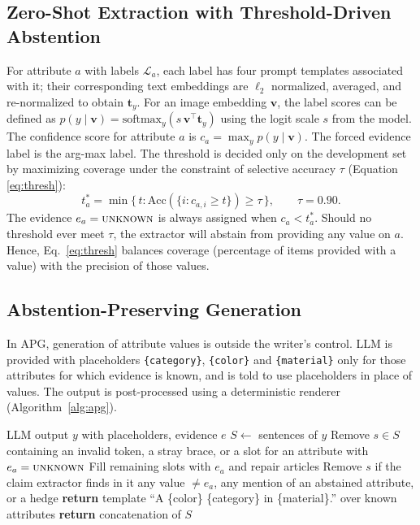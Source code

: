 \documentclass[runningheads]{llncs}
\newcommand{\unk}{\textsc{unknown}}
\begin{document}
\subsection{Zero-Shot Extraction with Threshold-Driven Abstention}
For attribute $a$ with labels $\mathcal{L}_a$, each label has four prompt templates associated with it; their corresponding text embeddings are $\ell_2$ normalized, averaged, and re-normalized to obtain $\mathbf{t}_y$. For an image embedding $\mathbf{v}$, the label scores can be defined as $p(y\mid\mathbf{v})=\mathrm{softmax}_y(s\,\mathbf{v}^\top\mathbf{t}_y)$ using the logit scale $s$ from the model. The confidence score for attribute $a$ is $c_a=\max_y p(y\mid\mathbf{v})$. The forced evidence label is the arg-max label. The threshold is decided only on the development set by maximizing coverage under the constraint of selective accuracy $\tau$ (Equation \ref{eq:thresh}):
\begin{equation}
t_a^{*}=\min\{\,t : \mathrm{Acc}(\{i : c_{a,i}\geq t\})\geq\tau\,\},\qquad \tau=0.90.
\label{eq:thresh}
\end{equation}
The evidence $e_a=\unk$ is always assigned when $c_a < t_a^*$. Should no threshold ever meet $\tau$, the extractor will abstain from providing any value on $a$. Hence, Eq.~\ref{eq:thresh} balances coverage (percentage of items provided with a value) with the precision of those values.

\subsection{Abstention-Preserving Generation}
In APG, generation of attribute values is outside the writer's control. LLM is provided with placeholders \texttt{\{category\}}, \texttt{\{color\}} and \texttt{\{material\}} only for those attributes for which evidence is known, and is told to use placeholders in place of values. The output is post-processed using a deterministic renderer (Algorithm~\ref{alg:apg}).

\begin{algorithm}[!htb]
\footnotesize
\caption{APG renderer}
\label{alg:apg}
\begin{algorithmic}[1]
\REQUIRE LLM output $y$ with placeholders, evidence $e$
\STATE $S \leftarrow$ sentences of $y$
\STATE Remove $s\in S$ containing an invalid token, a stray brace, or a slot for an attribute with $e_a=\unk$
\STATE Fill remaining slots with $e_a$ and repair articles
\STATE Remove $s$ if the claim extractor finds in it any value $\neq e_a$, any mention of an abstained attribute, or a hedge
\STATE \textbf{return} template ``A \{color\} \{category\} in \{material\}.'' over known attributes
\ENDIF
\STATE \textbf{return} concatenation of $S$
\end{algorithmic}
\end{algorithm}
\end{document}
